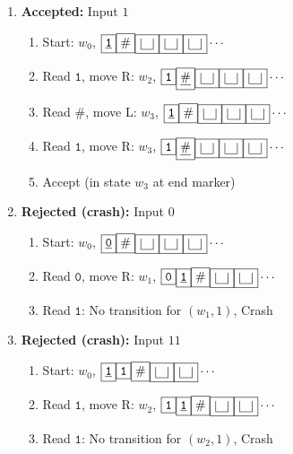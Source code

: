 \documentclass[12pt,a4paper,openany]{article}
\begin{document}
\begin{enumerate}

\item \textbf{Accepted:} Input $1$

\begin{enumerate}
\item Start: $w_0$, $\boxed{\underline{\mathtt{1}}}\boxed{\#}\boxed{\scalebox{2.5}{\textvisiblespace}}\boxed{\scalebox{2.5}{\textvisiblespace}}\boxed{\scalebox{2.5}{\textvisiblespace}}\cdots$
\item Read $\mathtt{1}$, move R: $w_2$, $\boxed{\mathtt{1}}\boxed{\underline{\#}}\boxed{\scalebox{2.5}{\textvisiblespace}}\boxed{\scalebox{2.5}{\textvisiblespace}}\boxed{\scalebox{2.5}{\textvisiblespace}}\cdots$
\item Read $\#$, move L: $w_3$, $\boxed{\underline{\mathtt{1}}}\boxed{\#}\boxed{\scalebox{2.5}{\textvisiblespace}}\boxed{\scalebox{2.5}{\textvisiblespace}}\boxed{\scalebox{2.5}{\textvisiblespace}}\cdots$
\item Read $\mathtt{1}$, move R: $w_3$, $\boxed{\mathtt{1}}\boxed{\underline{\#}}\boxed{\scalebox{2.5}{\textvisiblespace}}\boxed{\scalebox{2.5}{\textvisiblespace}}\boxed{\scalebox{2.5}{\textvisiblespace}}\cdots$
\item Accept (in state $w_3$ at end marker)
\end{enumerate}

\item \textbf{Rejected (crash):} Input $0$

\begin{enumerate}
\item Start: $w_0$, $\boxed{\underline{\mathtt{0}}}\boxed{\#}\boxed{\scalebox{2.5}{\textvisiblespace}}\boxed{\scalebox{2.5}{\textvisiblespace}}\boxed{\scalebox{2.5}{\textvisiblespace}}\cdots$
\item Read $\mathtt{0}$, move R: $w_1$, $\boxed{\mathtt{0}}\boxed{\underline{\mathtt{1}}}\boxed{\#}\boxed{\scalebox{2.5}{\textvisiblespace}}\boxed{\scalebox{2.5}{\textvisiblespace}}\cdots$
\item Read $\mathtt{1}$: No transition for $(w_1, 1)$, Crash
\end{enumerate}

\item \textbf{Rejected (crash):} Input $11$

\begin{enumerate}
\item Start: $w_0$, $\boxed{\underline{\mathtt{1}}}\boxed{\mathtt{1}}\boxed{\#}\boxed{\scalebox{2.5}{\textvisiblespace}}\boxed{\scalebox{2.5}{\textvisiblespace}}\cdots$
\item Read $\mathtt{1}$, move R: $w_2$, $\boxed{\mathtt{1}}\boxed{\underline{\mathtt{1}}}\boxed{\#}\boxed{\scalebox{2.5}{\textvisiblespace}}\boxed{\scalebox{2.5}{\textvisiblespace}}\cdots$
\item Read $\mathtt{1}$: No transition for $(w_2, 1)$, Crash
\end{enumerate}


\end{enumerate}
\end{document}
